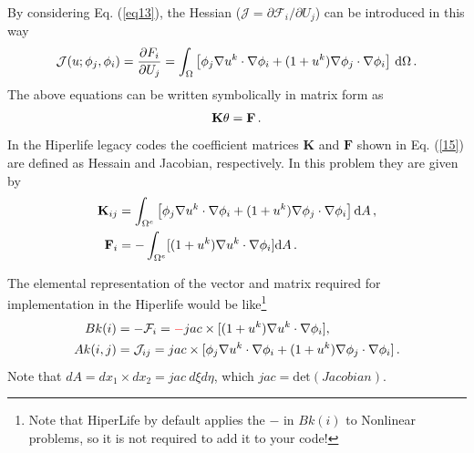 \documentclass[]{article}
\begin{document}
By considering Eq. (\ref{eq13}), the Hessian ($\mathcal{J}=\partial \mathcal{F}_i/\partial U_j$) can be introduced in this way
\begin{equation}\label{eq14}
	\begin{aligned}
		\mathcal{J}(u;\phi_j,\phi_i) = {\partial F_i\over\partial U_j} = \int_\Omega \left\lbrack \phi_j \nabla u^k \cdot \nabla \phi_i + (1+u^k) \nabla \phi_j \cdot \nabla \phi_i \right\rbrack \, \mathrm{d}\Omega\thinspace .
	\end{aligned}
\end{equation}
The above equations can be written symbolically in matrix form as
\begin{equation}\label{eq15}
	\begin{aligned}
		\mathbf{K}\mathbf{\theta} = \mathbf{F}\thinspace.
	\end{aligned}
\end{equation}
In the Hiperlife legacy codes the coefficient matrices $\mathbf{K}$ and $\mathbf{F}$  shown in Eq. (\ref{15}) are defined as Hessain and Jacobian, respectively. In this problem they are given by
\begin{equation}\label{eq16}
	\begin{aligned}
		\mathbf{K}_{ij} &= \int_{\Omega^e} \left\lbrack \phi_j \nabla u^k \cdot \nabla \phi_i + (1+u^k) \nabla \phi_j \cdot \nabla \phi_i \right\rbrack\mathrm{d}A\thinspace,\\
		\mathbf{F}_i &=-\int_{\Omega^e} [(1+u^k)\nabla u^k\cdot \nabla \phi_i]\mathrm{d}A \thinspace.
	\end{aligned}
\end{equation}

The elemental representation of the vector and matrix required for implementation in the Hiperlife would be like\footnote{Note that HiperLife by default applies the $-$ in $Bk(i)$ to Nonlinear problems, so it is not required to add it to your code!}
\begin{equation}\label{eq17}
	\begin{aligned}[b]
		Bk(i) &= -\mathcal{F}_i = \mathcolor{red}{-}jac \times[(1+u^k)\nabla u^k\cdot \nabla \phi_i], \\
		Ak(i,j) &=  \mathcal{J}_{ij} = jac \times [\phi_j \nabla u^k \cdot \nabla \phi_i + (1+u^k) \nabla \phi_j \cdot \nabla \phi_i]\thinspace .
	\end{aligned}
\end{equation}
Note that $dA=dx_{1} \times dx_{2}=jac \ d\xi d\eta$, which $jac=\mathrm{det}(Jacobian)$.
\end{document}
